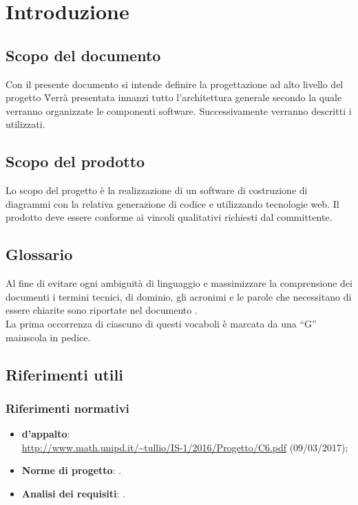 \documentclass[../PianoDiQualifica.tex]{subfiles}
\begin{document}
	\section{Introduzione}
		\subsection{Scopo del documento} 
			Con il presente documento si intende definire la progettazione ad alto livello del progetto \progetto\.
			Verrà presentata innanzi tutto l'architettura generale secondo la quale verranno organizzate le componenti software. Successivamente verranno descritti i  utilizzati.
		\subsection{Scopo del prodotto}
			Lo scopo del progetto è la realizzazione di un software di
			costruzione di diagrammi  con la relativa generazione
			di codice  e  utilizzando tecnologie
			web. Il prodotto deve essere conforme ai vincoli qualitativi
			richiesti dal committente.
		\subsection{Glossario}
			Al fine di evitare ogni ambiguità di linguaggio e massimizzare la
			comprensione dei documenti i termini tecnici, di dominio, gli
			acronimi e le parole che necessitano di essere chiarite sono
			riportate nel documento \glossariov.\\
			La prima occorrenza di ciascuno di questi vocaboli è
			marcata da una ``G'' maiuscola in pedice.
		\subsection{Riferimenti utili}
			\subsubsection{Riferimenti normativi}
    			\begin{itemize}
    				\item \textbf{ d'appalto}:\\
    				\url{http://www.math.unipd.it/~tullio/IS-1/2016/Progetto/C6.pdf} (09/03/2017);
    				\item \textbf{Norme di progetto}: \normediprogettov.
    				\item \textbf{Analisi dei requisiti}: \analisideirequisitiv.
				\end{itemize}
\end{document}
